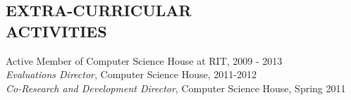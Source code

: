 \documentclass[line,margin]{res}
\begin{document}
\begin{resume}
\section{EXTRA-CURRICULAR \\ ACTIVITIES}             
           Active Member of Computer Science House at RIT, 2009 - 2013 \\
	{\it Evaluations Director}, Computer Science House, 2011-2012 \\
	{\it Co-Research and Development Director}, Computer Science House, Spring 2011

 

\end{resume}
\end{document}
